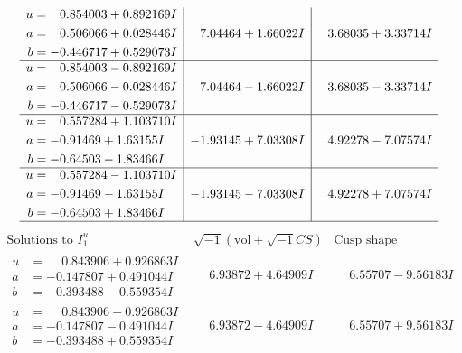 \documentclass[1p]{elsarticle_modified}
\theoremstyle{definition}
\newcommand{\I}{\sqrt{-1}}
\begin{document}
$$\begin{array}{c|c|c}
\begin{aligned}
u &= \phantom{-}0.854003 + 0.892169 I \\
a &= \phantom{-}0.506066 + 0.028446 I \\
b &= -0.446717 + 0.529073 I\end{aligned}
 & \phantom{-}7.04464 + 1.66022 I & \phantom{-}3.68035 + 3.33714 I \\ \hline\begin{aligned}
u &= \phantom{-}0.854003 - 0.892169 I \\
a &= \phantom{-}0.506066 - 0.028446 I \\
b &= -0.446717 - 0.529073 I\end{aligned}
 & \phantom{-}7.04464 - 1.66022 I & \phantom{-}3.68035 - 3.33714 I \\ \hline\begin{aligned}
u &= \phantom{-}0.557284 + 1.103710 I \\
a &= -0.91469 + 1.63155 I \\
b &= -0.64503 - 1.83466 I\end{aligned}
 & -1.93145 + 7.03308 I & \phantom{-}4.92278 - 7.07574 I \\ \hline\begin{aligned}
u &= \phantom{-}0.557284 - 1.103710 I \\
a &= -0.91469 - 1.63155 I \\
b &= -0.64503 + 1.83466 I\end{aligned}
 & -1.93145 - 7.03308 I & \phantom{-}4.92278 + 7.07574 I\\
 \hline 
 \end{array}$$\newpage$$\begin{array}{c|c|c}  
\text{Solutions to }I^u_{1}& \I (\text{vol} + \sqrt{-1}CS) & \text{Cusp shape}\\
 \hline 
\begin{aligned}
u &= \phantom{-}0.843906 + 0.926863 I \\
a &= -0.147807 + 0.491044 I \\
b &= -0.393488 - 0.559354 I\end{aligned}
 & \phantom{-}6.93872 + 4.64909 I & \phantom{-}6.55707 - 9.56183 I \\ \hline\begin{aligned}
u &= \phantom{-}0.843906 - 0.926863 I \\
a &= -0.147807 - 0.491044 I \\
b &= -0.393488 + 0.559354 I\end{aligned}
 & \phantom{-}6.93872 - 4.64909 I & \phantom{-}6.55707 + 9.56183 I \\ \hline\begin{aligned}

\end{aligned}
\end{array}$$
\end{document}
